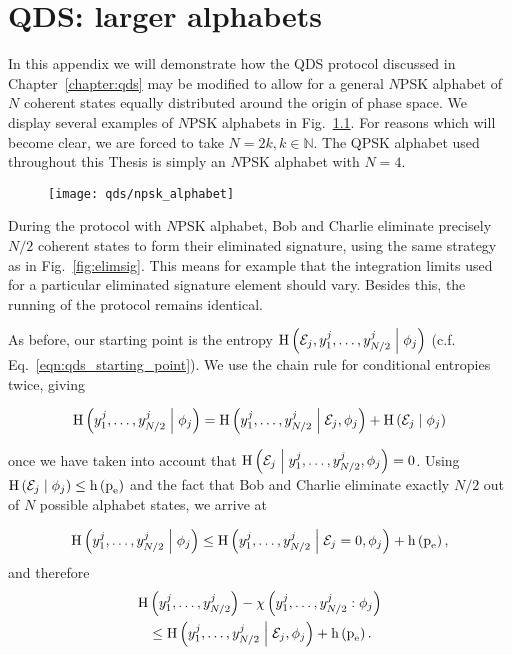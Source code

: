 \chapter{QDS: larger alphabets}\label{appendix:qds_larger_alphabets}

In this appendix we will demonstrate how the QDS protocol discussed in Chapter~\ref{chapter:qds} may be modified to allow for a general $N$PSK alphabet of $N$ coherent states equally distributed around the origin of phase space. We display several examples of $N$PSK alphabets in Fig.~\ref{fig:appendix_npsk}. For reasons which will become clear, we are forced to take $N = 2 k, k \in \mathbb{N}$. The QPSK alphabet used throughout this Thesis is simply an $N$PSK alphabet with $N=4$.

\begin{figure}[htp]
\captionsetup{width=0.8\linewidth}
\centering
\texttt{[image: qds/npsk\_alphabet]}
\caption{\label{fig:appendix_npsk} }
\end{figure}

During the protocol with $N$PSK alphabet, Bob and Charlie eliminate precisely $N/2$ coherent states to form their eliminated signature, using the same strategy as in Fig.~\ref{fig:elimsig}. This means for example that the integration limits used for a particular eliminated signature element should vary. Besides this, the running of the protocol remains identical.

As before, our starting point is the entropy $\text{H}\left( \mathcal{E}_j, y_1^j, \dots, y_{N/2}^j \; \middle| \; \phi_j \right)$ (c.f. Eq.~\ref{eqn:qds_starting_point}). We use the chain rule for conditional entropies twice, giving

\begin{equation}
\text{H}\left(y_1^j, \dots, y_{N/2}^j \; \middle| \; \phi_j\right) = \text{H}\left(y_1^j, \dots, y_{N/2}^j \; \middle| \; \mathcal{E}_j, \phi_j \right) + \text{H}\left(\mathcal{E}_j \; \middle| \; \phi_j\right)
\end{equation}

\noindent once we have taken into account that $\text{H}\left(\mathcal{E}_j \; \middle| \; y_1^j, \dots, y_{N/2}^j, \phi_j \right)=0$. Using $\text{H}\left(\mathcal{E}_j \; \middle| \; \phi_j \right) \le \text{h}\left(\text{p}_{\text{e}}\right)$ and the fact that Bob and Charlie eliminate exactly $N/2$ out of $N$ possible alphabet states, we arrive at

\begin{equation}
\text{H}\left(y_1^j, \dots, y_{N/2}^j \; \middle| \; \phi_j\right) \le \text{H}\left(y_1^j, \dots, y_{N/2}^j\; \middle| \; \mathcal{E}_j = 0, \phi_j\right) + \text{h}\left(\text{p}_{\text{e}}\right),
\end{equation}
and therefore
\begin{align}
\text{H}&\left(y_1^j, \dots, y_{N/2}^j\right) - \chi\left(y_1^j, \dots, y_{N/2}^j : \phi_j\right) \notag \\
%
& \le \text{H}\left(y_1^j, \dots, y_{N/2}^j \given \mathcal{E}_j, \phi_j\right) + \text{h}\left(\pe\right).
\end{align}

